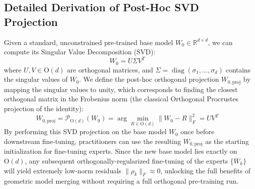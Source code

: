\subsection{Detailed Derivation of Post-Hoc SVD Projection}
\label{deriv:posthoc_svd}
Given a standard, unconstrained pre-trained base model $W_0 \in \mathbb{R}^{d \times d}$, we can compute its Singular Value Decomposition (SVD):
\begin{equation}
W_0 = U \Sigma V^T
\end{equation}
where $U, V \in \mathrm{O}(d)$ are orthogonal matrices, and $\Sigma = \operatorname{diag}(\sigma_1, \dots, \sigma_d)$ contains the singular values of $W_0$. We define the post-hoc orthogonal projection $W_{0,\text{proj}}$ by mapping the singular values to unity, which corresponds to finding the closest orthogonal matrix in the Frobenius norm (the classical Orthogonal Procrustes projection of the identity):
\begin{equation}
W_{0,\text{proj}} = \mathcal{P}_{\mathrm{O}(d)}(W_0) = \arg\min_{R \in \mathrm{O}(d)} \|W_0 - R\|_F^2 = U V^T
\end{equation}
By performing this SVD projection on the base model $W_0$ once before downstream fine-tuning, practitioners can use the resulting $W_{0,\text{proj}}$ as the starting initialization for fine-tuning experts. Since the new base model lies exactly on $\mathrm{O}(d)$, any subsequent orthogonally-regularized fine-tuning of the experts $\{W_k\}$ will yield extremely low-norm residuals $\|\rho_k\|_F \approx 0$, unlocking the full benefits of geometric model merging without requiring a full orthogonal pre-training run.

